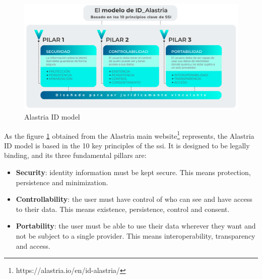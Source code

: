 \documentclass[a4paper, 12pt]{article} %
\begin{document}
    \begin{figure}[h]
        \centering
        \includegraphics[width=1.0\textwidth]{pilares_alastria.png}
        \caption{Alastria ID model}
        \label{fig:pilares_alastria}
    \end{figure}
                    
    As the figure \ref{fig:pilares_alastria} obtained from the Alastria main website\footnote{https://alastria.io/en/id-alastria/} represents, the Alastria ID model is based in the 10 key principles of the \acrshort{ssi}. It is designed to be legally binding, and its three fundamental pillars are:
    \begin{itemize}
        \item \textbf{Security}: identity information must be kept secure. This means protection, persistence and minimization.
        \item \textbf{Controllability}: the user must have control of who can see and have access to their data. This means existence, persistence, control and consent.
        \item \textbf{Portability}: the user must be able to use their data wherever they want and not be subject to a single provider. This means interoperability, transparency and access.
    \end{itemize}
    
\end{document}
